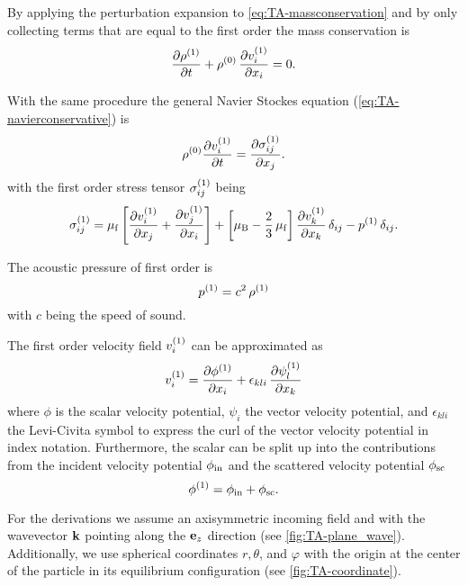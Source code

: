 By applying the perturbation expansion to \cref{eq:TA-massconservation} and by 
only collecting terms that are equal to the first order the mass conservation 
is
\begin{equation}
  \pdv{  \rho^{(1)}  }{t} + 
  \rho^{(0)}\,\pdv{  v_{i}^{(1)}  }{x_{i}} = 0.
  \label{eq:TA-st-massconservation}
\end{equation}

With the same procedure the general Navier Stockes equation 
(\cref{eq:TA-navierconservative}) is
\begin{equation}
  \rho^{(0)} \pdv{  v_{i}^{(1)}  }{t} = 
  \pdv{  \sigma_{ij}^{(1)}  }{x_{j}}.
  \label{eq:TA-st-navier}
\end{equation}
with the first order stress tensor $\sigma_{ij}^{(1)}$ being
\begin{equation}
  \sigma_{ij}^{(1)} = \mu_{\mathrm{f}}\left[ \pdv{  v_{i}^{(1)}  }{x_{j}} + 
  \pdv{  v_{j}^{(1)}  }{x_{i}} \right] + \left[ \mu_{\mathrm{B}} - 
  \frac{2}{3}\,\mu_{\mathrm{f}} \right] \pdv{  v_{k}^{(1)}  }{x_{k}} \,\delta_{ij} - 
  p^{(1)}\,\delta_{ij}.
  \label{eq:TA-st-stress}
\end{equation}

The acoustic pressure of first order is
\begin{equation}
  p^{(1)} = c^{2}\,\rho^{(1)}
  \label{eq:TA-st-pre}
\end{equation}
with $c$ being the speed of sound.

The first order velocity field $v_{i}^{(1)}$ can be approximated as
\begin{equation}
  v^{(1)}_{i} = \pdv{  \phi^{(1)}  }{x_{i}} + 
  \epsilon_{kli}\,\pdv{  \psi^{(1)}  _{l}}{x_{k}}
  \label{eq:TA-st-vel}
\end{equation}
where $\phi$ is the scalar velocity potential, $\psi_{i}$ the vector velocity 
potential, and $\epsilon_{kli}$ the Levi-Civita symbol to express the curl of 
the vector velocity potential in index notation. Furthermore, the scalar can be 
split up into the contributions from the incident velocity potential 
$\phi_{\mathrm{in}}$ and the scattered velocity potential $\phi_{\mathrm{sc}}$
\begin{equation}
  \phi^{(1)} = \phi_{\mathrm{in}} + \phi_{\mathrm{sc}}.
  \label{eq:TA-scalar-potential}
\end{equation}

For the derivations we assume an axisymmetric incoming field and with the 
wavevector $\vb{k}$ pointing along the $\vb{e}_{z}$ direction (see 
\cref{fig:TA-plane_wave}). Additionally, we use spherical coordinates $r, 
\theta$, and $\varphi$ with the origin at the center of the particle in its 
equilibrium configuration (see \cref{fig:TA-coordinate}).

